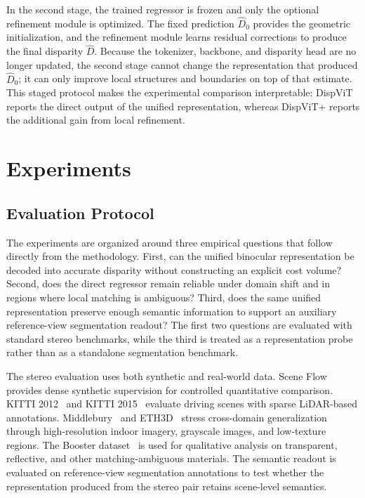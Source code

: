 In the second stage, the trained regressor is frozen and only the optional refinement module is optimized.
The fixed prediction $\hat{D}_0$ provides the geometric initialization, and the refinement module learns residual corrections to produce the final disparity $\hat{D}$.
Because the tokenizer, backbone, and disparity head are no longer updated, the second stage cannot change the representation that produced $\hat{D}_0$; it can only improve local structures and boundaries on top of that estimate.
This staged protocol makes the experimental comparison interpretable: DispViT reports the direct output of the unified representation, whereas DispViT+ reports the additional gain from local refinement.

\section{Experiments}
\label{sec:dispvit_experiments}

\subsection{Evaluation Protocol}
The experiments are organized around three empirical questions that follow directly from the methodology.
First, can the unified binocular representation be decoded into accurate disparity without constructing an explicit cost volume?
Second, does the direct regressor remain reliable under domain shift and in regions where local matching is ambiguous?
Third, does the same unified representation preserve enough semantic information to support an auxiliary reference-view segmentation readout?
The first two questions are evaluated with standard stereo benchmarks, while the third is treated as a representation probe rather than as a standalone segmentation benchmark.

The stereo evaluation uses both synthetic and real-world data.
Scene Flow~\cite{mayer2016large} provides dense synthetic supervision for controlled quantitative comparison.
KITTI 2012~\cite{geiger2012we} and KITTI 2015~\cite{menze2015object} evaluate driving scenes with sparse LiDAR-based annotations.
Middlebury~\cite{scharstein2014high} and ETH3D~\cite{schops2017multi} stress cross-domain generalization through high-resolution indoor imagery, grayscale images, and low-texture regions.
The Booster dataset~\cite{zamaramirez2022booster} is used for qualitative analysis on transparent, reflective, and other matching-ambiguous materials.
The semantic readout is evaluated on reference-view segmentation annotations to test whether the representation produced from the stereo pair retains scene-level semantics.

